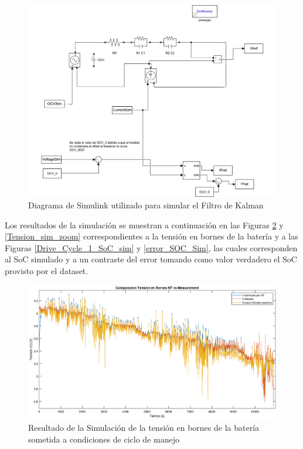 \documentclass[10pt,a4paper]{article}
\begin{document}
	\begin{figure}[h!]
		\begin{center}
			\includegraphics[width=1\textwidth]{simulink.pdf}
			\caption{Diagrama de Simulink utilizado para simular el Filtro de Kalman}
			\label{simulink_diagram}
		\end{center}
	\end{figure}
	
	\clearpage
	
	\noindent Los resultados de la simulación se muestran a continuación en las 
    Figuras \ref{Tension_sim} y \ref{Tension_sim_zoom} correspondientes a la 
    tensión en bornes de la batería y a las Figuras \ref{Drive_Cycle_1_SoC_sim} 
    y \ref{error_SOC_Sim}, las cuales corresponden al SoC simulado y a un 
    contraste del error tomando como valor verdadero el SoC provisto por el dataset.
	
	\begin{figure}[h!]
		\begin{center}
			\includegraphics[width=1\textwidth]{Tension_Sim.eps}
			\caption{Resultado de la Simulación de la tensión en bornes de la 
                     batería sometida a condiciones de ciclo de manejo}
			\label{Tension_sim}
		\end{center}
	\end{figure}
	
\end{document}
